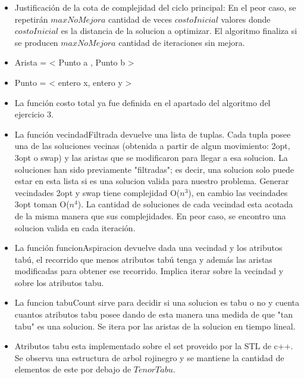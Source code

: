 \begin{itemize}
\item Justificación de la cota de complejidad del ciclo principal: En el peor caso, se repetirán $maxNoMejora$ cantidad de veces $costoInicial$ valores donde $costoInicial$ es la distancia de la solucion a optimizar. El algoritmo finaliza si se producen $maxNoMejora$ cantidad de iteraciones sin mejora.
\item Arista = < Punto a , Punto b >
\item Punto = < entero x, entero y >
\item La función costo total ya fue definida en el apartado del algoritmo del ejercicio 3.
\item La función vecindadFiltrada devuelve una lista de tuplas. Cada tupla posee una de las soluciones vecinas (obtenida a partir de algun movimiento: 2opt, 3opt o swap) y las aristas que se modificaron para llegar a esa solucion. La soluciones han sido previamente "filtradas"; es decir, una solucion solo puede estar en esta lista si es una solucion valida para nuestro problema. Generar vecindades 2opt y swap tiene complejidad O($n^3$), en cambio las vecindades 3opt toman O($n^4$).
	La cantidad de soluciones de cada vecindad esta acotada de la misma manera que sus complejidades. En peor caso, se encontro una solucion valida en cada iteraci\'on.
\item La función funcionAspiracion devuelve dada una vecindad y los atributos tabú, el recorrido que menos atributos tabú tenga y además las aristas modificadas para obtener ese recorrido. Implica iterar sobre la vecindad y sobre los atributos tabu. 
\item La funcion tabuCount sirve para decidir si una solucion es tabu o no y cuenta cuantos atributos tabu posee dando de esta manera una medida de que "tan tabu" es una solucion. Se itera por las aristas de la solucion en tiempo lineal.
\item Atributos tabu esta implementado sobre el set proveido por la STL de c++. Se observa una estructura de arbol rojinegro y se mantiene la cantidad de elementos de este por debajo de $TenorTabu$.
\end{itemize}
